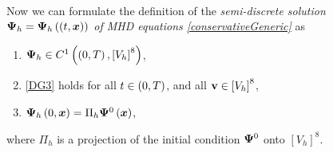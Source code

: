 \paragraph{}
Now we can formulate the definition of the \textit{semi-discrete solution ${\mathrm{\mathbf{\Psi}}_h} = {\mathrm{\mathbf{\Psi}}_h}\left((t, \mbox{\boldmath $x$}\right))$ of MHD equations \ref{conservativeGeneric}} as
\begin{enumerate}
    \label{discreteSlnDef}
    \item ${\mathrm{\mathbf{\Psi}}_h} \in C^{1}\left(\left(0, T\right), \left[V_h\right]^8\right)$,
    \item \ref{DG3} holds for all $t\in\left(0, T\right)$, and all $\mathrm{\mathbf{v}}\in \left[V_h\right]^8$,
    \item ${\mathrm{\mathbf{\Psi}}_h}\left(0, \mbox{\boldmath $x$}\right) = \Pi_h \mathrm{\mathbf{\Psi}}^0\left(\mbox{\boldmath $x$}\right)$,
\end{enumerate}
where $\Pi_h$ is a projection of the initial condition $\mathrm{\mathbf{\Psi}}^0$ onto $\left[V_h\right]^8$.


